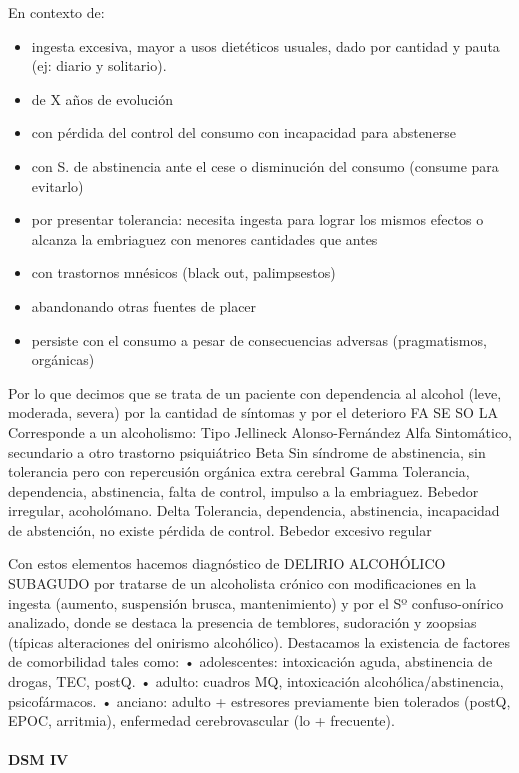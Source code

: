 \documentclass[encares.tex]{subfiles}
\begin{document}
En contexto de:
\begin{itemize}
\item ingesta excesiva, mayor a usos dietéticos usuales, dado por cantidad y pauta (ej: diario y solitario).
\item de X años de evolución
\item con pérdida del control del consumo con incapacidad para abstenerse
\item con S. de abstinencia ante el cese o disminución del consumo (consume para evitarlo)
\item por presentar tolerancia: necesita ingesta para lograr los mismos efectos o alcanza la embriaguez con menores cantidades que antes
\item con trastornos mnésicos (black out, palimpsestos)
\item abandonando otras fuentes de placer
\item persiste con el consumo a pesar de consecuencias adversas (pragmatismos, orgánicas)
\end{itemize}
Por lo que decimos que se trata de un paciente con dependencia al alcohol (leve, moderada, severa) por la cantidad de síntomas y por el deterioro FA SE SO LA Corresponde a un alcoholismo: Tipo Jellineck Alonso-Fernández Alfa Sintomático, secundario a otro trastorno psiquiátrico Beta Sin síndrome de abstinencia, sin tolerancia pero con repercusión orgánica extra cerebral Gamma Tolerancia, dependencia, abstinencia, falta de control, impulso a la embriaguez. Bebedor irregular, acoholómano. Delta Tolerancia, dependencia, abstinencia, incapacidad de abstención, no existe pérdida de control. Bebedor excesivo regular

Con estos elementos hacemos diagnóstico de DELIRIO ALCOHÓLICO SUBAGUDO por tratarse de un alcoholista crónico con modificaciones en la ingesta (aumento, suspensión brusca, mantenimiento) y por el Sº confuso-onírico analizado, donde se destaca la presencia de temblores, sudoración y zoopsias (típicas alteraciones del onirismo alcohólico). Destacamos la existencia de factores de comorbilidad tales como: • adolescentes: intoxicación aguda, abstinencia de drogas, TEC, postQ. • adulto: cuadros MQ, intoxicación alcohólica/abstinencia, psicofármacos. • anciano: adulto + estresores previamente bien tolerados (postQ, EPOC, arritmia), enfermedad cerebrovascular (lo + frecuente).
\paragraph{DSM IV}
\end{document}
